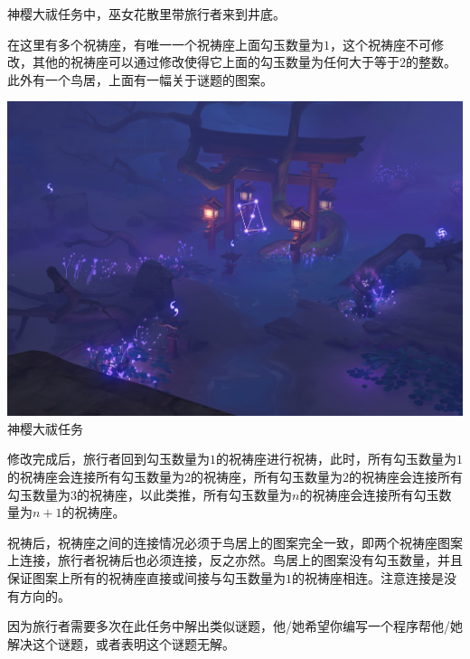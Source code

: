 神樱大祓任务中，巫女花散里带旅行者来到井底。

在这里有多个祝祷座，有唯一一个祝祷座上面勾玉数量为$1$，这个祝祷座不可修改，其他的祝祷座可以通过修改使得它上面的勾玉数量为任何大于等于$2$的整数。此外有一个鸟居，上面有一幅关于谜题的图案。

\begin{center}
  \includegraphics[scale=0.25]{puzzle.jpg} \\
  \small{神樱大祓任务}
\end{center}

修改完成后，旅行者回到勾玉数量为$1$的祝祷座进行祝祷，此时，所有勾玉数量为$1$的祝祷座会连接所有勾玉数量为$2$的祝祷座，所有勾玉数量为$2$的祝祷座会连接所有勾玉数量为$3$的祝祷座，以此类推，所有勾玉数量为$n$的祝祷座会连接所有勾玉数量为$n + 1$的祝祷座。

祝祷后，祝祷座之间的连接情况必须于鸟居上的图案完全一致，即两个祝祷座图案上连接，旅行者祝祷后也必须连接，反之亦然。鸟居上的图案没有勾玉数量，并且保证图案上所有的祝祷座直接或间接与勾玉数量为$1$的祝祷座相连。注意连接是没有方向的。

因为旅行者需要多次在此任务中解出类似谜题，他/她希望你编写一个程序帮他/她解决这个谜题，或者表明这个谜题无解。